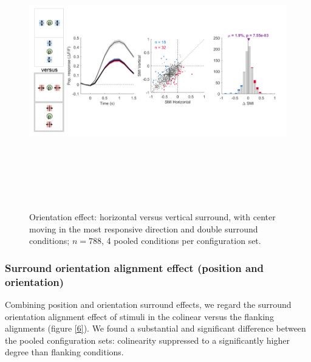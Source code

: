 \begin{figure}[H] \centering \includegraphics[width=12cm,height=12cm,keepaspectratio]{Figures/7.Results/finalPopulation/sel/diagrams/5.png} 
\caption{Orientation effect: horizontal versus vertical surround, with center moving in the most responsive direction and double surround conditions;  $n=788$, 4 pooled conditions per configuration set.} 
\label{5}
\end{figure}

\subsubsection{Surround orientation alignment effect (position and orientation)}

Combining position and orientation surround effects, we regard the surround orientation alignment effect of stimuli in the colinear versus the flanking alignments (figure \ref{6}). We found a substantial and significant difference between the pooled configuration sets: colinearity suppressed to a significantly higher degree than flanking conditions.

